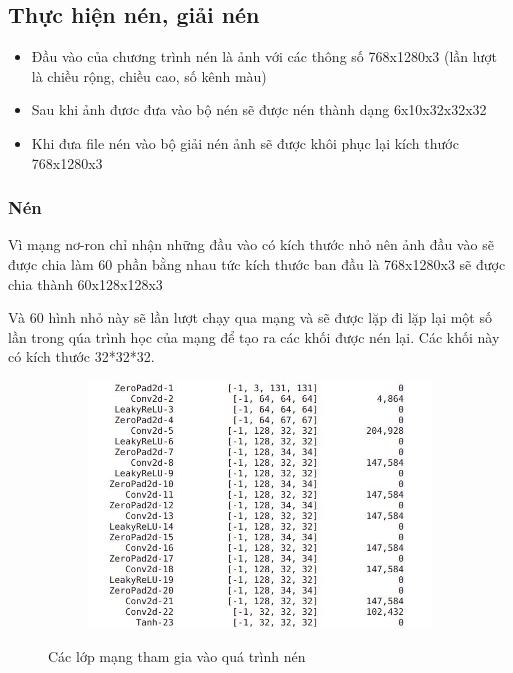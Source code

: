 \subsection{Thực hiện nén, giải nén}


\begin{itemize}
    \item Đầu vào của chương trình nén là ảnh với các thông số 768x1280x3 (lần lượt là chiều rộng, chiều cao, số kênh màu)
    \item Sau khi ảnh đươc đưa vào bộ nén sẽ được nén thành dạng 6x10x32x32x32
    \item Khi đưa file nén vào bộ giải nén ảnh sẽ được khôi phục lại kích thước 768x1280x3
\end{itemize}

\subsubsection{Nén}
Vì mạng nơ-ron chỉ nhận những đầu vào có kích thước nhỏ nên ảnh đầu vào sẽ được chia
làm 60 phần bằng nhau tức kích thước ban đầu là 768x1280x3 sẽ được chia thành 60x128x128x3

Và 60 hình nhỏ này sẽ lần lượt chạy qua mạng và sẽ được lặp đi lặp lại một số lần
trong qúa trình học của mạng để tạo ra các khối được nén lại. Các khối này có kích thước
32*32*32.

\begin{figure}
    \begin{subfigure}{0.8\textwidth}
        \includegraphics[width=1.\linewidth]{Chapters/items/encode.jpg}

        \label{fig: encode}
    \end{subfigure}
    \caption{Các lớp mạng tham gia vào quá trình nén}
\end{figure}

